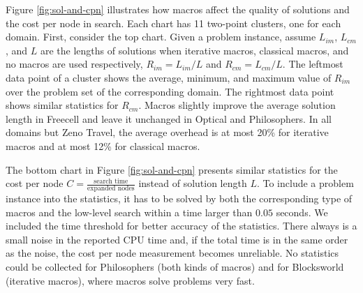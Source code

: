 \documentclass{article}
\begin{document}
Figure \ref{fig:sol-and-cpn} illustrates how macros affect the quality of solutions and 
the cost per node in search. Each chart has 11 two-point clusters, one for each domain.
First, consider the top chart.
Given a problem instance, assume $L_{\textit{im}}$, $L_{\textit{cm}}$, 
and $L$ are the lengths of solutions 
when iterative macros, classical macros, and no macros are used respectively,
$R_{\textit{im}} = L_{\textit{im}}/L$ and $R_{\textit{cm}} = L_{\textit{cm}}/L$.
The leftmost data point of a cluster shows the average, minimum,
and maximum value of $R_{\textit{im}}$
over the problem set of the corresponding domain.
The rightmost data point shows similar statistics for $R_{\textit{cm}}$.
Macros slightly improve the average solution length in Freecell
and leave it unchanged in Optical and Philosophers.
In all domains but Zeno Travel, the average overhead is at most 20\% for
iterative macros and at most 12\% for classical macros.

The bottom chart in Figure \ref{fig:sol-and-cpn} presents similar statistics for 
the cost per node $C = \frac{\mbox{search time}}{\mbox{expanded nodes}}$
instead of solution length $L$.
To include a problem instance into the statistics, it has to be solved by
both the corresponding type of macros and the low-level search within a time
larger than $0.05$ seconds.
We included the time threshold for better accuracy of the statistics.
There always is a small noise in the reported CPU time and,
if the total time is in the same order as the noise, the cost per node measurement
becomes unreliable. 
No statistics could be collected for Philosophers (both kinds of macros)
and for Blocksworld (iterative macros), where macros solve problems very fast.

\end{document}
